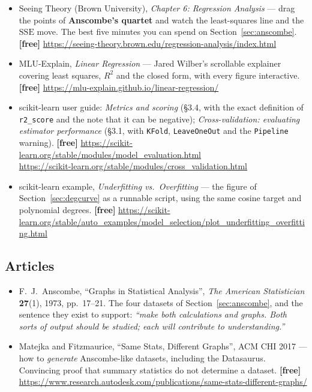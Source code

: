 \documentclass[11pt]{article}
\begin{document}
\begin{itemize}[leftmargin=*]
  \item Seeing Theory (Brown University), \emph{Chapter 6: Regression
    Analysis} --- drag the points of \textbf{Anscombe's quartet} and watch the
    least-squares line and the $\mathrm{SSE}$ move. The best five minutes you
    can spend on Section~\ref{sec:anscombe}. \textbf{[free]}
    \url{https://seeing-theory.brown.edu/regression-analysis/index.html}
  \item MLU-Explain, \emph{Linear Regression} --- Jared Wilber's scrollable
    explainer covering least squares, $R^2$ and the closed form, with every
    figure interactive. \textbf{[free]}
    \url{https://mlu-explain.github.io/linear-regression/}
  \item scikit-learn user guide: \emph{Metrics and scoring} (\S3.4, with the
    exact definition of \texttt{r2\_score} and the note that it can be
    negative); \emph{Cross-validation: evaluating estimator performance}
    (\S3.1, with \texttt{KFold}, \texttt{LeaveOneOut} and the
    \texttt{Pipeline} warning). \textbf{[free]}
    \url{https://scikit-learn.org/stable/modules/model_evaluation.html} \\
    \url{https://scikit-learn.org/stable/modules/cross_validation.html}
  \item scikit-learn example, \emph{Underfitting vs.\ Overfitting} --- the
    figure of Section~\ref{sec:degcurve} as a runnable script, using the same
    cosine target and polynomial degrees. \textbf{[free]}
    \url{https://scikit-learn.org/stable/auto_examples/model_selection/plot_underfitting_overfitting.html}
\end{itemize}

\subsection*{Articles}

\begin{itemize}[leftmargin=*]
  \item F.\ J.\ Anscombe, ``Graphs in Statistical Analysis'', \emph{The
    American Statistician} \textbf{27}(1), 1973, pp.\ 17--21. The four
    datasets of Section~\ref{sec:anscombe}, and the sentence they exist to
    support: \emph{``make both calculations and graphs. Both sorts of output
    should be studied; each will contribute to understanding.''}
  \item Matejka and Fitzmaurice, ``Same Stats, Different Graphs'', ACM CHI
    2017 --- how to \emph{generate} Anscombe-like datasets, including the
    Datasaurus. Convincing proof that summary statistics do not determine a
    dataset. \textbf{[free]}
    \url{https://www.research.autodesk.com/publications/same-stats-different-graphs/}
\end{itemize}

\enlargethispage{4\baselineskip}
\notesources{\AMLUnitVSources}
\end{document}
